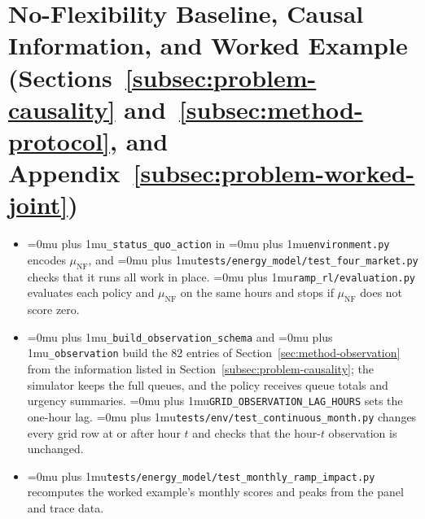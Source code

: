 \documentclass{UNCC-thesis}
\newcommand{\codepath}[1]{{\Urlmuskip=0mu plus 1mu\relax\nolinkurl{#1}}}
\begin{document}
\section{No-Flexibility Baseline, Causal Information, and Worked Example
  (Sections~\ref{subsec:problem-causality} and~\ref{subsec:method-protocol}, and
  Appendix~\ref{subsec:problem-worked-joint})}
\begin{itemize}
  \item \codepath{_status_quo_action} in \codepath{environment.py} encodes
        \(\mu_{\mathrm{NF}}\), and
        \codepath{tests/energy_model/test_four_market.py} checks that it
        runs all work in place. \codepath{ramp_rl/evaluation.py} evaluates each
        policy and \(\mu_{\mathrm{NF}}\) on the same hours and stops if
        \(\mu_{\mathrm{NF}}\) does not score zero.
  \item \codepath{_build_observation_schema} and \codepath{_observation} build
        the 82 entries of Section~\ref{sec:method-observation} from the
        information listed in Section~\ref{subsec:problem-causality}; the
        simulator keeps the full queues, and the policy receives queue totals
        and urgency summaries. \codepath{GRID_OBSERVATION_LAG_HOURS} sets the
        one-hour lag. \codepath{tests/env/test_continuous_month.py} changes
        every grid row at or after hour \(t\) and checks that the hour-\(t\)
        observation is unchanged.
  \item \codepath{tests/energy_model/test_monthly_ramp_impact.py}
        recomputes the worked example's monthly scores and peaks from the
        panel and trace data.
\end{itemize}
\end{document}

